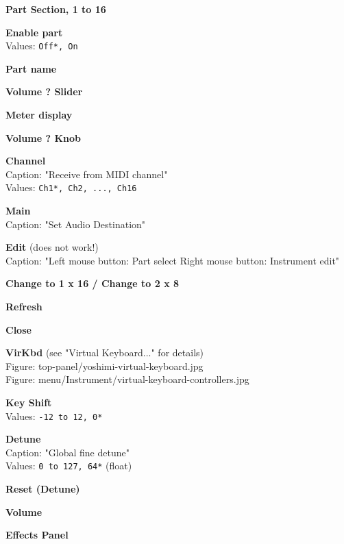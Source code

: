 \documentclass[
 11pt,
 twoside,
 a4paper,
 headinclude,
 footinclude,
 final                                 %
]{article}
\begin{document}
\begin{enumber}
\begin{enumber}
\begin{enumber}
         \item \textbf{Part Section, 1 to 16}
         \begin{enumber}
            \item \textbf{Enable part} \\
               Values: \texttt{Off*, On}
            \item \textbf{Part name}
            \item \textbf{Volume ? Slider}
            \item \textbf{Meter display}
            \item \textbf{Volume ? Knob}
            \item \textbf{Channel} \\
               Caption: "Receive from MIDI channel" \\
               Values: \texttt{Ch1*, Ch2, ..., Ch16}
            \item \textbf{Main} \\
               Caption: "Set Audio Destination"
            \item \textbf{Edit} (does not work!) \\
               Caption: "Left mouse button: Part select
               Right mouse button: Instrument edit"
         \end{enumber}
         \item \textbf{Change to 1 x 16 / Change to 2 x 8}
         \item \textbf{Refresh}
         \item \textbf{Close}
      \end{enumber}
      \item \textbf{VirKbd} (see "Virtual Keyboard..." for details) \\
         Figure: top-panel/yoshimi-virtual-keyboard.jpg \\
         Figure: menu/Instrument/virtual-keyboard-controllers.jpg
      \item \textbf{Key Shift} \\
         Values: \texttt{-12 to 12, 0*}
      \item \textbf{Detune} \\
         Caption: "Global fine detune" \\
         Values: \texttt{0 to 127, 64*} (float)
      \item \textbf{Reset (Detune)}
      \item \textbf{Volume}
   \end{enumber}
   \item \textbf{Effects Panel} \\

\end{enumber}
\end{document}
